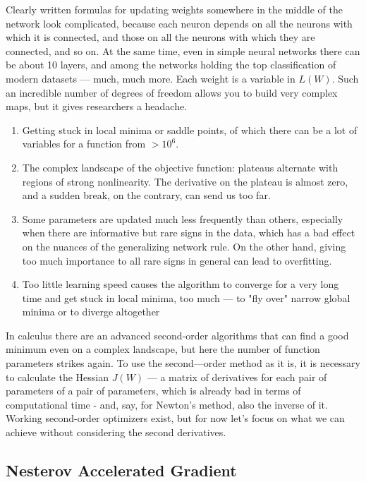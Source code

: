 Clearly written formulas for updating weights somewhere in the middle of the network look complicated, because each neuron depends on all the neurons with which it is connected, and those on all the neurons with which they are connected, and so on. At the same time, even in simple neural networks there can be about 10 layers, and among the networks holding the top classification of modern datasets — much, much more. Each weight is a variable in $L(W)$. Such an incredible number of degrees of freedom allows you to build very complex maps, but it gives researchers a headache.

\begin{enumerate}
    \item Getting stuck in local minima or saddle points, of which there can be a lot of variables for a function from $>10^6$.
    \item The complex landscape of the objective function: plateaus alternate with regions of strong nonlinearity. The derivative on the plateau is almost zero, and a sudden break, on the contrary, can send us too far.
    \item Some parameters are updated much less frequently than others, especially when there are informative but rare signs in the data, which has a bad effect on the nuances of the generalizing network rule. On the other hand, giving too much importance to all rare signs in general can lead to overfitting.
    \item Too little learning speed causes the algorithm to converge for a very long time and get stuck in local minima, too much — to "fly over" narrow global minima or to diverge altogether
\end{enumerate}

In calculus there are an advanced second-order algorithms that can find a good minimum even on a complex landscape, but here the number of function parameters strikes again. To use the second—order method as it is, it is necessary to calculate the Hessian $J(W)$ — a matrix of derivatives for each pair of parameters of a pair of parameters, which is already bad in terms of computational time - and, say, for Newton's method, also the inverse of it. Working second-order optimizers exist, but for now let's focus on what we can achieve without considering the second derivatives.

\subsection{Nesterov Accelerated Gradient}

